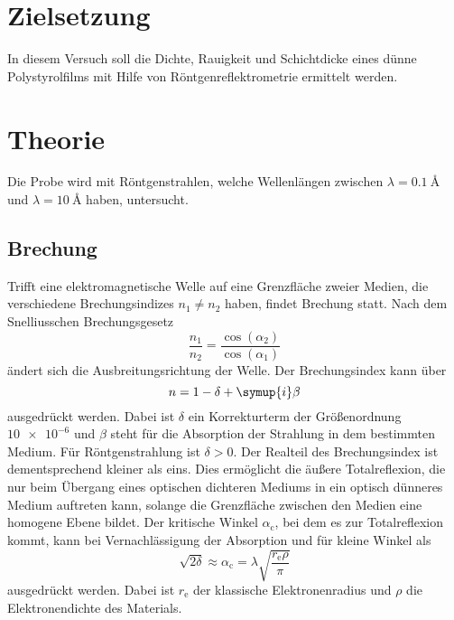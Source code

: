 \section{Zielsetzung}

    \noindent In diesem Versuch soll die Dichte, Rauigkeit und Schichtdicke eines dünne Polystyrolfilms mit Hilfe von Röntgenreflektrometrie 
    ermittelt werden. 

\section{Theorie}

    \noindent
    Die Probe wird mit Röntgenstrahlen, welche Wellenlängen zwischen $\lambda = \SI{0.1}{\angstrom}$ und $\lambda = \SI{10}{\angstrom}$ haben, 
    untersucht. 

    \subsection{Brechung}

        \noindent
        Trifft eine elektromagnetische Welle auf eine Grenzfläche zweier Medien, die verschiedene Brechungsindizes $n_1 \neq n_2$ haben, findet Brechung
        statt. Nach dem Snelliusschen Brechungsgesetz 
        \begin{equation*}
            \frac{n_1}{n_2} = \frac{\cos(\alpha_2)}{\cos(\alpha_1)}
        \end{equation*}
        ändert sich die Ausbreitungsrichtung der Welle. 
        Der Brechungsindex kann über 
        \begin{equation*}
            n = 1 - \delta + \symup{i} \beta 
        \end{equation*}
        ausgedrückt werden. Dabei ist $\delta$ ein Korrekturterm der Größenordnung $\num{10e-6}$ und $\beta$ steht für die Absorption der Strahlung in dem 
        bestimmten Medium. 
        Für Röntgenstrahlung ist $\delta > 0$. Der Realteil des Brechungsindex ist dementsprechend kleiner als eins. 
        Dies ermöglicht die äußere Totalreflexion, die nur beim Übergang eines optischen dichteren Mediums in ein optisch dünneres Medium auftreten kann, 
        solange die Grenzfläche zwischen den Medien eine homogene Ebene bildet. 
        Der kritische Winkel $\alpha_\text{c}$, bei dem es zur Totalreflexion kommt, kann bei Vernachlässigung der Absorption und für kleine Winkel als 
        \begin{equation}
            \sqrt{2 \delta} \approx \alpha_\text{c} = \lambda \sqrt{\frac{r_\text{e} \rho}{\pi}} \label{eqn:crit}
        \end{equation}
        ausgedrückt werden. Dabei ist $r_\text{e}$ der klassische Elektronenradius und $\rho$ die Elektronendichte des Materials. 

